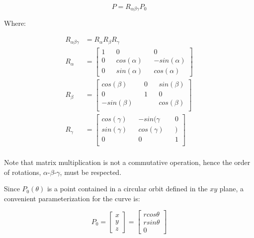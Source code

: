 \begin{equation}
	P = R_{\alpha \beta \gamma}P_{0}
\end{equation}

\indent
Where:

\begin{align}
	R_{\alpha \beta \gamma} &= R_{\alpha}R_{\beta}R_{\gamma} \\
	R_{\alpha} &= \begin{bmatrix}
					1 && 0           && 0            \\
					0 && cos(\alpha) && -sin(\alpha) \\
					0 && sin(\alpha) &&  cos(\alpha)
				 \end{bmatrix} \\			 
	R_{\beta} &= \begin{bmatrix}
					cos(\beta) && 0           && sin(\beta)         \\
					0 && 1 &&  0\\
					-sin(\beta) &&  &&  cos(\beta) \\
				 \end{bmatrix} \\			 
	R_{\gamma} &= \begin{bmatrix}
					cos(\gamma) && -sin(\gamma           && 0            \\
					sin(\gamma) && cos(\gamma) && ) \\
					0 && 0 &&  1 \\
				 \end{bmatrix} \\
\end{align}

\indent
Note that matrix multiplication is not a commutative operation, hence the order of rotations, $\alpha$-$\beta$-$\gamma$, must be respected.

\indent
Since $ P_0 (\theta) $ is a point contained in a circular orbit defined in the $xy$ plane, a convenient parameterization for the curve is:

\begin{equation}
	P_0 = \begin{bmatrix}
			x \\
			y \\
			z
		  \end{bmatrix} = \begin{bmatrix}
							r cos \theta \\
							r sin \theta \\
							0
		  				  \end{bmatrix}
\end{equation}

